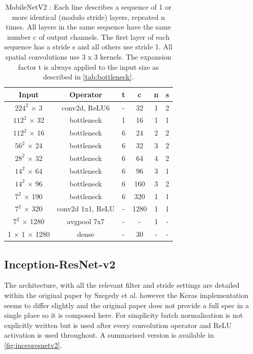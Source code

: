 \documentclass[12pt]{article}
\numberwithin{equation}{section}
\numberwithin{figure}{section}
\begin{document}
\begin{table}[H]
	\centering
	\begin{tabular}{c|c|c|c|c|c}
	\hline
	\textbf{Input}         & \textbf{Operator} & \textbf{t} & \textbf{c} & \textbf{n} & \textbf{s} \\ \hline \hline
	$224^2$ $\times$ 3         & conv2d, ReLU6           & -          & 32         & 1          & 2          \\
	$112^2$ $\times$ 32        & bottleneck        & 1          & 16         & 1          & 1          \\
	$112^2$ $\times$ 16        & bottleneck        & 6          & 24         & 2          & 2          \\
	$56^2$ $\times$ 24         & bottleneck        & 6          & 32         & 3          & 2          \\
	$28^2$ $\times$ 32         & bottleneck        & 6          & 64         & 4          & 2          \\
	$14^2$ $\times$ 64         & bottleneck        & 6          & 96         & 3          & 1          \\
	$14^2$ $\times$ 96         & bottleneck        & 6          & 160        & 3          & 2          \\
	$7^2$ $\times$ 190         & bottleneck        & 6          & 320        & 1          & 1          \\
	$7^2$ $\times$ 320         & conv2d 1x1, ReLU        & -          & 1280       & 1          & 1          \\
	$7^2$ $\times$ 1280        & avgpool 7x7       & -          & -          & 1          & -          \\
	1 $\times$ 1 $\times$ 1280 & dense             & -          & 30         & -          & -          \\ \hline
	\end{tabular}%
	\caption{MobileNetV2 : Each line describes a sequence of 1 or more identical (modulo stride) layers, repeated n times. All layers in the same sequence have the same number c of output channels. The first layer of each sequence has a stride s and all others use stride 1. All
	spatial convolutions use 3 x 3 kernels. The expansion factor t is always applied to the input size as described in \cref{tab:bottleneck}.
	}
	\label{tab:mobilenetv2_arch}
	\end{table}

\subsection{Inception-ResNet-v2} 
\label{sub:Inception-ResnetV2} 
The architecture, with all the relevant filter and stride settings are detailed within the original paper by Szegedy et al. \cite{Szegedy2016} however the Keras implementation seems to differ slightly and the original paper does not provide a full spec in a single place so it is composed here. For simplicity batch normalisation is not explicitly written but is used after every convolution operator and ReLU activation is used throughout. A summarised version is available in \cref{fig:incepresnetv2}\cite{Alemi2016}.
\end{document}
